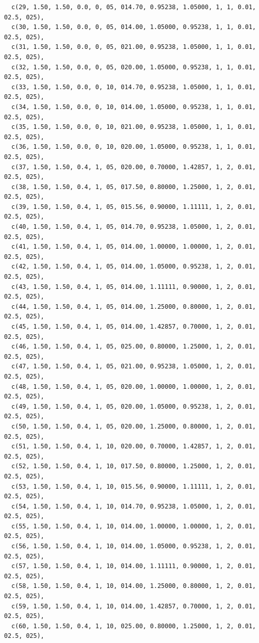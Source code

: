\documentclass[11pt, a4paper, oneside]{article}
\theoremstyle{Plain}
\theoremstyle{Definition}
\theoremstyle{Remark}
\begin{document}
\begin{appendix}
\begin{lstlisting}
  c(29, 1.50, 1.50, 0.0, 0, 05, 014.70, 0.95238, 1.05000, 1, 1, 0.01, 02.5, 025),
  c(30, 1.50, 1.50, 0.0, 0, 05, 014.00, 1.05000, 0.95238, 1, 1, 0.01, 02.5, 025),
  c(31, 1.50, 1.50, 0.0, 0, 05, 021.00, 0.95238, 1.05000, 1, 1, 0.01, 02.5, 025),
  c(32, 1.50, 1.50, 0.0, 0, 05, 020.00, 1.05000, 0.95238, 1, 1, 0.01, 02.5, 025),
  c(33, 1.50, 1.50, 0.0, 0, 10, 014.70, 0.95238, 1.05000, 1, 1, 0.01, 02.5, 025),
  c(34, 1.50, 1.50, 0.0, 0, 10, 014.00, 1.05000, 0.95238, 1, 1, 0.01, 02.5, 025),
  c(35, 1.50, 1.50, 0.0, 0, 10, 021.00, 0.95238, 1.05000, 1, 1, 0.01, 02.5, 025),
  c(36, 1.50, 1.50, 0.0, 0, 10, 020.00, 1.05000, 0.95238, 1, 1, 0.01, 02.5, 025),
  c(37, 1.50, 1.50, 0.4, 1, 05, 020.00, 0.70000, 1.42857, 1, 2, 0.01, 02.5, 025),
  c(38, 1.50, 1.50, 0.4, 1, 05, 017.50, 0.80000, 1.25000, 1, 2, 0.01, 02.5, 025),
  c(39, 1.50, 1.50, 0.4, 1, 05, 015.56, 0.90000, 1.11111, 1, 2, 0.01, 02.5, 025),
  c(40, 1.50, 1.50, 0.4, 1, 05, 014.70, 0.95238, 1.05000, 1, 2, 0.01, 02.5, 025),
  c(41, 1.50, 1.50, 0.4, 1, 05, 014.00, 1.00000, 1.00000, 1, 2, 0.01, 02.5, 025),
  c(42, 1.50, 1.50, 0.4, 1, 05, 014.00, 1.05000, 0.95238, 1, 2, 0.01, 02.5, 025),
  c(43, 1.50, 1.50, 0.4, 1, 05, 014.00, 1.11111, 0.90000, 1, 2, 0.01, 02.5, 025),
  c(44, 1.50, 1.50, 0.4, 1, 05, 014.00, 1.25000, 0.80000, 1, 2, 0.01, 02.5, 025),
  c(45, 1.50, 1.50, 0.4, 1, 05, 014.00, 1.42857, 0.70000, 1, 2, 0.01, 02.5, 025),
  c(46, 1.50, 1.50, 0.4, 1, 05, 025.00, 0.80000, 1.25000, 1, 2, 0.01, 02.5, 025),
  c(47, 1.50, 1.50, 0.4, 1, 05, 021.00, 0.95238, 1.05000, 1, 2, 0.01, 02.5, 025),
  c(48, 1.50, 1.50, 0.4, 1, 05, 020.00, 1.00000, 1.00000, 1, 2, 0.01, 02.5, 025),
  c(49, 1.50, 1.50, 0.4, 1, 05, 020.00, 1.05000, 0.95238, 1, 2, 0.01, 02.5, 025),
  c(50, 1.50, 1.50, 0.4, 1, 05, 020.00, 1.25000, 0.80000, 1, 2, 0.01, 02.5, 025),
  c(51, 1.50, 1.50, 0.4, 1, 10, 020.00, 0.70000, 1.42857, 1, 2, 0.01, 02.5, 025),
  c(52, 1.50, 1.50, 0.4, 1, 10, 017.50, 0.80000, 1.25000, 1, 2, 0.01, 02.5, 025),
  c(53, 1.50, 1.50, 0.4, 1, 10, 015.56, 0.90000, 1.11111, 1, 2, 0.01, 02.5, 025),
  c(54, 1.50, 1.50, 0.4, 1, 10, 014.70, 0.95238, 1.05000, 1, 2, 0.01, 02.5, 025),
  c(55, 1.50, 1.50, 0.4, 1, 10, 014.00, 1.00000, 1.00000, 1, 2, 0.01, 02.5, 025),
  c(56, 1.50, 1.50, 0.4, 1, 10, 014.00, 1.05000, 0.95238, 1, 2, 0.01, 02.5, 025),
  c(57, 1.50, 1.50, 0.4, 1, 10, 014.00, 1.11111, 0.90000, 1, 2, 0.01, 02.5, 025),
  c(58, 1.50, 1.50, 0.4, 1, 10, 014.00, 1.25000, 0.80000, 1, 2, 0.01, 02.5, 025),
  c(59, 1.50, 1.50, 0.4, 1, 10, 014.00, 1.42857, 0.70000, 1, 2, 0.01, 02.5, 025),
  c(60, 1.50, 1.50, 0.4, 1, 10, 025.00, 0.80000, 1.25000, 1, 2, 0.01, 02.5, 025),

\end{lstlisting}
\end{appendix}
\end{document}
